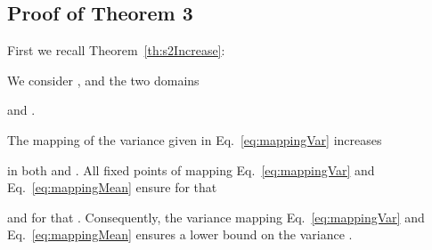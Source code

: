 \documentclass{article}
\begin{document}
\subsection{Proof of Theorem 3}

First we recall Theorem~\ref{th:s2Increase}:
\begin{theorem*}[Increasing ]
We consider , 
and the two domains 
 
 and
 .

The mapping of the variance
  given in Eq.~\eqref{eq:mappingVar} increases

in both  and .
All fixed
points  of mapping Eq.~\eqref{eq:mappingVar} and
Eq.~\eqref{eq:mappingMean} ensure for  that
 
and for  that .
Consequently, the variance mapping Eq.~\eqref{eq:mappingVar} and
Eq.~\eqref{eq:mappingMean} ensures a lower bound on the variance . 
\end{theorem*}
\end{document}
